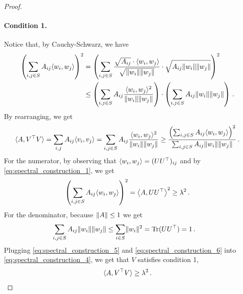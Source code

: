 \begin{proof}
    \paragraph{Condition 1.}
    Notice that, by Cauchy-Schwarz, we have
    \begin{align*}
        \left(\sum_{i, j \in S} A_{i j} \langle w_i, w_j\rangle\right)^2
        & = \left(\sum_{i, j \in S} \frac{ \sqrt{A_{i j}} \cdot \langle w_i, w_j\rangle}{\sqrt{\lVert w_i\rVert \lVert w_j\rVert}} \cdot \sqrt{A_{i j} \lVert w_i\rVert \lVert w_j\rVert}\right)^2 \\
        & \leq \left(\sum_{i, j \in S} A_{i j} \frac{\langle w_i, w_j\rangle^2}{\lVert w_i\rVert \lVert w_j\rVert}\right) \cdot \left(\sum_{i, j \in S} A_{i j} \lVert w_i\rVert \lVert w_j\rVert\right) \,.
    \end{align*}
    By rearranging, we get
    \begin{equation}
    \label{eq:spectral_construction_4}
        \iprod{A, V^{\top} V}
        = \sum_{i, j} A_{i j} \iprod{v_i, v_j}
        = \sum_{i, j \in S} A_{i j} \frac{\iprod{w_i, w_j}^2}{\norm{w_i} \norm{w_j}} \\
        \geq \frac{\Paren{\sum_{i, j \in S} A_{i j} \iprod{w_i, w_j}}^2}{\sum_{i, j \in S} A_{i j} \norm{w_i} \norm{w_j}} \,.
    \end{equation}
    For the numerator, by observing that $\langle w_i, w_j\rangle = (U U^{\top})_{i j}$ and by \cref{eq:spectral_construction_1}, we get
    \begin{equation}
    \label{eq:spectral_construction_5}
        \Paren{\sum_{i, j \in S} A_{i j} \iprod{w_i, w_j}}^2
        = \Iprod{A, U U^{\top}}^2
        \geq \lambda^2 \,.
    \end{equation}
    For the denominator, because $\left\lVert A\right\rVert \leq 1$ we get
    \begin{align}
    \label{eq:spectral_construction_6}
    \begin{split}
        \sum_{i, j \in S} A_{i j} \norm{w_i} \norm{w_j}
        &\leq  \sum_{i \in S} \norm{w_i}^2
        = \Tr(U U^{\top})
        = 1 \,.
    \end{split}
    \end{align}
    Plugging \cref{eq:spectral_construction_5} and \cref{eq:spectral_construction_6} into \cref{eq:spectral_construction_4}, we get that $V$ satisfies condition 1,
    \begin{equation*}
        \langle A, V^{\top} V\rangle \geq \lambda^2 \,.
    \end{equation*}


\end{proof}
